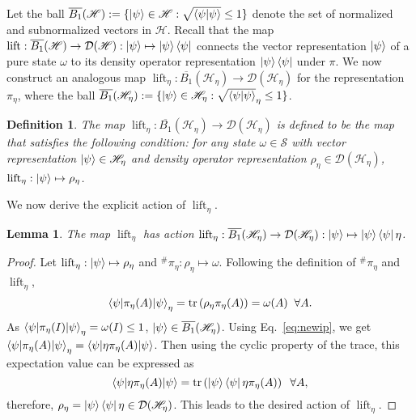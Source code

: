 \documentclass[amsmath,amssymb,aps,pra,superscriptaddress,twocolumn]{revtex4-2}
\newtheorem{definition}{Definition}
\newtheorem{lemma}[theorem]{Lemma}
\begin{document}
\begin{appendix}
Let the ball $\overline{B_1}(\mathscr{H}) := \{\ket{\psi} \in \mathscr{H}: \sqrt{\braket{\psi|\psi}} \le 1\}$ 
denote the set of normalized and subnormalized vectors in $\mathscr{H}$. 
Recall that the map $\operatorname{lift}:\overline{B_1}(\mathscr{H}) \to \mathcal{D}(\mathscr{H}):
\ket{\psi} \mapsto \ket{\psi}\bra{\psi}$
connects the vector representation $\ket{\psi}$ of a pure state $\omega$ to its density operator representation
$\ket{\psi}\bra{\psi}$ under $\pi$. 
We now construct an analogous map $\operatorname{lift}_\eta: \overline{B_1}(\mathscr{H}_\eta) \to \mathcal{D}\left(\mathscr{H}_\eta\right)$
for the representation $\pi_\eta$, where the ball 
$\overline{B_1}(\mathscr{H}_\eta) := \{\ket{\psi} \in \mathscr{H}_\eta: \sqrt{\braket{\psi|\psi}}_\eta \le 1\}$. 
\begin{definition}
The map $\operatorname{lift}_\eta: \overline{B_1}(\mathscr{H}_\eta) \to \mathcal{D}(\mathscr{H}_\eta)$ is defined to be the map that 
satisfies the following condition: for any state $\omega \in \mathcal{S}$ with vector representation
$\ket{\psi} \in \mathscr{H}_\eta$ and density operator representation $\rho_\eta \in \mathcal{D}(\mathscr{H}_\eta)$,
$\operatorname{lift}_\eta:\ket{\psi} \mapsto \rho_\eta$.
\end{definition}
We now derive the explicit action of $\operatorname{lift}_\eta$.
\begin{lemma}
\label{lem:lifteta}
The map $\operatorname{lift}_\eta$ has action 
$\operatorname{lift}_\eta:\overline{B_1}(\mathscr{H}_\eta)\to \mathcal{D}(\mathscr{H}_\eta):\ket{\psi} \mapsto \ket{\psi}\bra{\psi}\eta$.
\end{lemma}
\begin{proof}
Let $\operatorname{lift}_\eta:\ket{\psi} \mapsto \rho_\eta$ and ${}^\#\pi_\eta:\rho_\eta \mapsto \omega$. 
Following the definition of ${}^\#\pi_\eta$ and  $\operatorname{lift}_\eta$,
\begin{equation}
    \braket{\psi|\pi_\eta(A)|\psi}_\eta = \text{tr}\left(\rho_\eta\pi_\eta(A)\right) = \omega(A) \;\; \forall A.
\end{equation}
As $\braket{\psi|\pi_\eta(I)|\psi}_\eta  = \omega(I)\le 1$, $\ket{\psi} \in \overline{B_1}(\mathscr{H}_\eta)$.
Using Eq.~\eqref{eq:newip}, we get $\braket{\psi|\pi_\eta(A)|\psi}_\eta = \braket{\psi|\eta\pi_\eta(A)|\psi}$. Then using
the cyclic property of the trace, this expectation value can be expressed as
\begin{equation}
    \braket{\psi|\eta\pi_\eta(A)|\psi} = \text{tr}\left(\ket{\psi}\bra{\psi}\eta\pi_\eta(A)\right) \;\; \forall A,
\end{equation}
therefore, $\rho_\eta = \ket{\psi}\bra{\psi}\eta \in \mathcal{D}(\mathscr{H}_\eta)$.
This leads to the desired action of $\operatorname{lift}_\eta$.


\end{proof}
\end{appendix}
\end{document}
